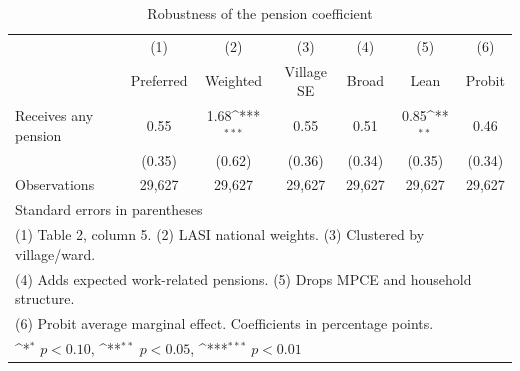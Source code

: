 \begin{table}[htbp]\centering
\def\sym#1{\ifmmode^{#1}\else\(^{#1}\)\fi}
\caption{Robustness of the pension coefficient\label{tab:robust}}
\begin{tabular}{l*{6}{c}}
\toprule
                    &\multicolumn{1}{c}{(1)}&\multicolumn{1}{c}{(2)}&\multicolumn{1}{c}{(3)}&\multicolumn{1}{c}{(4)}&\multicolumn{1}{c}{(5)}&\multicolumn{1}{c}{(6)}\\
                    &\multicolumn{1}{c}{Preferred}&\multicolumn{1}{c}{Weighted}&\multicolumn{1}{c}{Village SE}&\multicolumn{1}{c}{Broad}&\multicolumn{1}{c}{Lean}&\multicolumn{1}{c}{Probit}\\
\midrule
Receives any pension&        0.55         &        1.68\sym{***}&        0.55         &        0.51         &        0.85\sym{**} &        0.46         \\
                    &      (0.35)         &      (0.62)         &      (0.36)         &      (0.34)         &      (0.35)         &      (0.34)         \\
\midrule
Observations        &      29,627         &      29,627         &      29,627         &      29,627         &      29,627         &      29,627         \\
\bottomrule
\multicolumn{7}{l}{\footnotesize Standard errors in parentheses}\\
\multicolumn{7}{l}{\footnotesize (1) Table 2, column 5. (2) LASI national weights. (3) Clustered by village/ward.}\\
\multicolumn{7}{l}{\footnotesize (4) Adds expected work-related pensions. (5) Drops MPCE and household structure.}\\
\multicolumn{7}{l}{\footnotesize (6) Probit average marginal effect. Coefficients in percentage points.}\\
\multicolumn{7}{l}{\footnotesize \sym{*} \(p<0.10\), \sym{**} \(p<0.05\), \sym{***} \(p<0.01\)}\\
\end{tabular}
\end{table}
